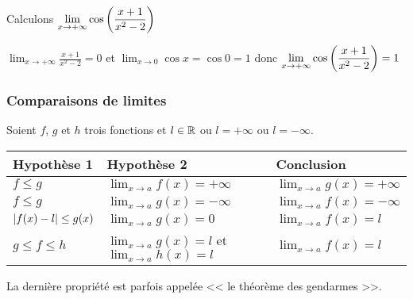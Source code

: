 \begin{example}
 Calculons $\displaystyle \lim_{x \to +\infty} \cos\left(\frac{x+1}{x^{2}-2}\right)$ 
 
 $\displaystyle \lim_{x \to +\infty} \frac{x+1}{x^{2}-2} = 0 $ et $ \displaystyle \lim_{x \to 0} \cos x = \cos0=1 $ donc $  \displaystyle\lim_{x \to +\infty}\cos\left(\frac{x+1}{x^{2}-2}\right)=1 $

\end{example}  

 \subsubsection{Comparaisons de limites}

Soient $f $, $g$ et $h$ trois fonctions et $ l\in\mathbb{R}$ ou $ l= +\infty $ ou $ l=-\infty $.


\begin{tabularx}{\textwidth}{|X|X|X|}
\hline
\textbf{ Hypothèse 1}  & \textbf{Hypothèse 2} & \textbf{ Conclusion }\\
\hline
$ f\leq g $  & $ \displaystyle \lim_{x \to a}f(x)=+\infty $ & $\displaystyle \lim_{x \to a}g(x)=+\infty $ \\
 \hline
 $ f\leq g $  & $\displaystyle \lim_{x \to a}g(x)=-\infty $ & $ \displaystyle \lim_{x \to a}f(x)=-\infty $    \\
\hline
$ \left\lvert f(x)-l  \right\rvert\leq g(x) $ & $\displaystyle \lim_{x \to a}g(x)=0$ & $ \displaystyle \lim_{x \to a}f(x)=l  $ \\
\hline
$ g \leq f \leq h $ & $ \displaystyle \lim_{x \to a}g(x)=l $ et $ \displaystyle \lim_{x \to a}h(x)=l $ & $ \displaystyle \lim_{x \to a}f(x)=l $    \\
\hline
\end{tabularx}


\begin{remark}
 
La dernière propriété est parfois appelée << le théorème des gendarmes >>.
 \end{remark}

